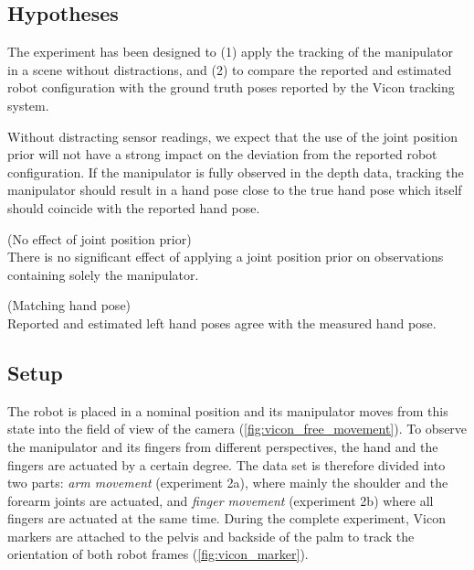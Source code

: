 \subsection{Hypotheses}

The experiment has been designed to (1) apply the tracking of the manipulator in a scene without distractions, and (2) to compare the reported and estimated robot configuration with the ground truth poses reported by the Vicon tracking system.

Without distracting sensor readings, we expect that the use of the joint position prior will not have a strong impact on the deviation from the reported robot configuration. If the manipulator is fully observed in the depth data, tracking the manipulator should result in a hand pose close to the true hand pose which itself should coincide with the reported hand pose.

\begin{hypothesis}(No effect of joint position prior)\\
There is no significant effect of applying a joint position prior on observations containing solely the manipulator.
\label{hyp:no_prior_effect}
\end{hypothesis}

\begin{hypothesis}(Matching hand pose)\\
Reported and estimated left hand poses agree with the measured hand pose.
\label{hyp:matching_hand_pose}
\end{hypothesis}


\subsection{Setup}

The robot is placed in a nominal position and its manipulator moves from this state into the field of view of the camera (\cref{fig:vicon_free_movement}). To observe the manipulator and its fingers from different perspectives, the hand and the fingers are actuated by a certain degree. The data set is therefore divided into two parts: \textit{arm movement} (experiment 2a), where mainly the shoulder and the forearm joints are actuated, and \textit{finger movement} (experiment 2b) where all fingers are actuated at the same time. During the complete experiment, Vicon markers are attached to the pelvis and backside of the palm to track the orientation of both robot frames (\cref{fig:vicon_marker}).

